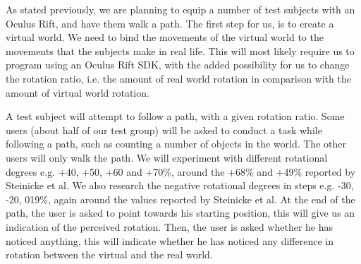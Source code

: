 As stated previously, we are planning to equip a number of test subjects with an Oculus Rift, and have them walk a path.
The first step for us, is to create a virtual world.
We need to bind the movements of the virtual world to the movements that the subjects make in real life.
This will most likely require us to program using an Oculus Rift SDK, with the added possibility for us to change the rotation ratio, i.e. the amount of real world rotation in comparison with the amount of virtual world rotation.

A test subject will attempt to follow a path, with a given rotation ratio.
Some users (about half of our test group) will be asked to conduct a task while following a path, such as counting a number of objects in the world.
The other users will only walk the path.
We will experiment with different rotational degrees e.g. +40, +50, +60 and +70\%, around the +68\% and +49\% reported by Steinicke et al.
We also research the negative rotational degrees in steps e.g. -30, -20, 019\%, again around the values reported by Steinicke et al.
At the end of the path, the user is asked to point towards his starting position, this will give us an indication of the perceived rotation.
Then, the user is asked whether he has noticed anything, this will indicate whether he has noticed any difference in rotation between the virtual and the real world.
